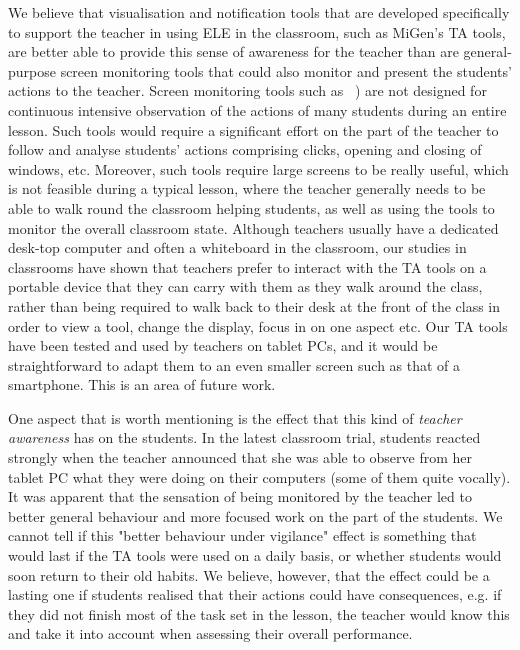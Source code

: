 We believe that visualisation and notification tools that are
developed specifically to support the teacher in using ELE in the
classroom, such as MiGen’s TA tools, are better able to provide this
sense of awareness for the teacher than are general-purpose screen
monitoring tools that could also monitor and present the students’
actions to the teacher. Screen monitoring tools such as
~\cite{monitor1,monitor2,monitor3,monitor4,monitor5}) are not designed
for continuous intensive observation of the actions of many students
during an entire lesson. Such tools would require a significant effort
on the part of the teacher to follow and analyse students’ actions
comprising clicks, opening and closing of windows, etc. Moreover, such
tools require large screens to be really useful, which is not feasible
during a typical lesson, where the teacher generally needs to be able
to walk round the classroom helping students, as well as using the
tools to monitor the overall classroom state. Although teachers
usually have a dedicated desk-top computer and often a whiteboard in
the classroom, our studies in classrooms have shown that teachers
prefer to interact with the TA tools on a portable device that they
can carry with them as they walk around the class, rather than being
required to walk back to their desk at the front of the class in order
to view a tool, change the display, focus in on one aspect etc. Our TA
tools have been tested and used by teachers on tablet PCs, and it
would be straightforward to adapt them to an even smaller screen such
as that of a smartphone. This is an area of future work.
 
One aspect that is worth mentioning is the effect that this kind of
\emph{teacher awareness} has on the students. In the latest classroom
trial, students reacted strongly when the teacher announced that she
was able to observe from her tablet PC what they were doing on their
computers (some of them quite vocally). It was apparent that the
sensation of being monitored by the teacher led to better general
behaviour and more focused work on the part of the students. We cannot
tell if this "better behaviour under vigilance" effect is something
that would last if the TA tools were used on a daily basis, or whether
students would soon return to their old habits. We believe, however,
that the effect could be a lasting one if students realised that their
actions could have consequences, e.g. if they did not finish most of
the task set in the lesson, the teacher would know this and take it
into account when assessing their overall performance.
 
